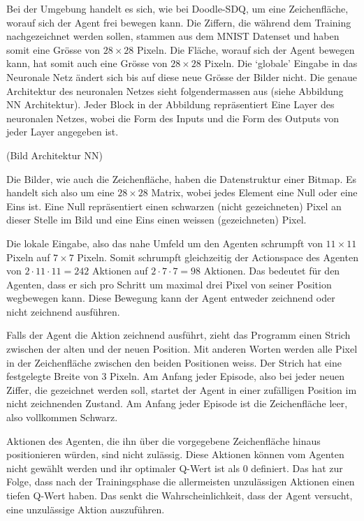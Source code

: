 Bei der Umgebung handelt es sich, wie bei Doodle-SDQ, um eine Zeichenfläche,
worauf sich der Agent frei bewegen kann. Die Ziffern, die während dem Training
nachgezeichnet werden sollen, stammen aus dem MNIST Datenset und haben somit
eine Grösse von $28\times28$ Pixeln. Die Fläche, worauf sich der Agent bewegen   
kann, hat somit auch eine Grösse von $28\times28$ Pixeln. Die `globale' Eingabe
in das Neuronale Netz ändert sich bis auf diese neue Grösse der Bilder nicht.
Die genaue Architektur des neuronalen Netzes sieht folgendermassen aus (siehe
Abbildung NN Architektur). Jeder Block in der Abbildung repräsentiert Eine Layer
des neuronalen Netzes, wobei die Form des Inputs und die Form des Outputs von
jeder Layer angegeben ist. 

(Bild Architektur NN) %

Die Bilder, wie auch die Zeichenfläche, haben die Datenstruktur einer Bitmap. Es
handelt sich also um eine $28\times28$ Matrix, wobei jedes Element eine Null oder eine 
Eins ist. Eine Null repräsentiert einen schwarzen (nicht gezeichneten) Pixel an
dieser Stelle im Bild und eine Eins einen weissen (gezeichneten) Pixel.

Die lokale Eingabe, also das nahe Umfeld um den Agenten schrumpft von
$11\times11$ Pixeln auf $7\times7$ Pixeln. Somit schrumpft gleichzeitig der
Actionspace des Agenten von $2\cdot11\cdot11 = 242$ Aktionen auf $2\cdot7\cdot7
= 98$ Aktionen. Das bedeutet für den Agenten, dass er sich pro Schritt um
maximal drei Pixel von seiner Position wegbewegen kann. Diese Bewegung
kann der Agent entweder zeichnend oder nicht zeichnend
ausführen.

Falls der Agent die Aktion zeichnend ausführt, zieht das Programm einen Strich
zwischen der alten und der neuen Position. Mit anderen Worten werden alle Pixel
in der Zeichenfläche zwischen den beiden Positionen weiss. Der Strich hat eine
festgelegte Breite von $3$ Pixeln. Am Anfang jeder Episode, also bei jeder neuen
Ziffer, die gezeichnet werden soll, startet der Agent in einer zufälligen
Position im nicht zeichnenden Zustand. Am Anfang jeder Episode ist die
Zeichenfläche leer, also vollkommen Schwarz.

Aktionen des Agenten, die ihn über die vorgegebene Zeichenfläche hinaus
positionieren würden, sind nicht zulässig. Diese Aktionen können vom Agenten
nicht gewählt werden und ihr optimaler Q-Wert ist als $0$ definiert. Das hat zur
Folge, dass nach der Trainingsphase die allermeisten unzulässigen Aktionen einen
tiefen Q-Wert haben. Das senkt die Wahrscheinlichkeit, dass der Agent versucht,
eine unzulässige Aktion auszuführen.


